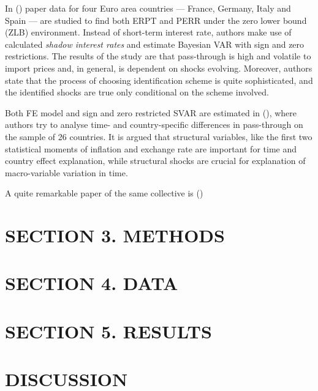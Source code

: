 \documentclass[12pt, a4paper]{extarticle}
\begin{document}
In (\cite{Comunale2017}) paper data for four Euro area countries --- France, Germany, Italy and Spain --- are studied to find both ERPT and PERR under the zero lower bound (ZLB) environment. Instead of short-term interest rate, authors make use of calculated \textit{shadow interest rates} and estimate Bayesian VAR with sign and zero restrictions. The results of the study are that pass-through is high and volatile to import prices and, in general, is dependent on shocks evolving. Moreover, authors state that the process of choosing identification scheme is quite sophisticated, and the identified shocks are true only conditional on the scheme involved.

Both FE model and sign and zero restricted SVAR are estimated in (\cite{Forbes2017}), where authors try to analyse time- and country-specific differences in pass-through on the sample of 26 countries. It is argued that structural variables, like the first two statistical moments of inflation and exchange rate are important for time and country effect explanation, while structural shocks are crucial for explanation of macro-variable variation in time.

A quite remarkable paper of the same collective is (\cite{Forbes2018})


\section*{SECTION 3. METHODS}
\setcounter{section}{3}


\section*{SECTION 4. DATA}

\setcounter{section}{2}


\section*{SECTION 5. RESULTS}
\setcounter{section}{4}
\setcounter{subsection}{0}

\clearpage

\section*{DISCUSSION}
\end{document}
